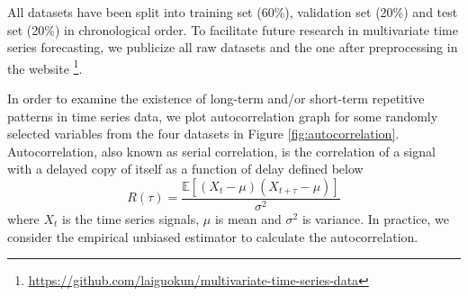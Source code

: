 \begin{table}
	\begin{center}
        \caption{Dataset Statistics, where $T$ is length of time series, $D$ is number of variables, $L$ is the sample rate.}
		\label{tb:data-stats}
	\end{center}
\end{table}

All datasets have been split into training set (60\%), validation set (20\%) and test set (20\%) in chronological order. To facilitate future research in multivariate time series forecasting, we publicize all raw datasets and the one after preprocessing in the website
\footnote{\url{https://github.com/laiguokun/multivariate-time-series-data}}.



In order to examine the existence of long-term and/or short-term repetitive patterns in time series data, we plot autocorrelation graph for some randomly selected variables from the four datasets in Figure \ref{fig:autocorrelation}. Autocorrelation, also known as serial correlation, is the correlation of a signal with a delayed copy of itself as a function of delay defined below
\begin{equation*}
	R(\tau) =  \frac{\mathbb{E}[(X_t - \mu)(X_{t+\tau} - \mu)]}{\sigma^2}
\end{equation*}
where $X_t$ is the time series signals, $\mu$ is mean and $\sigma^2$ is variance. In practice, we consider the empirical unbiased estimator to calculate the autocorrelation.  

